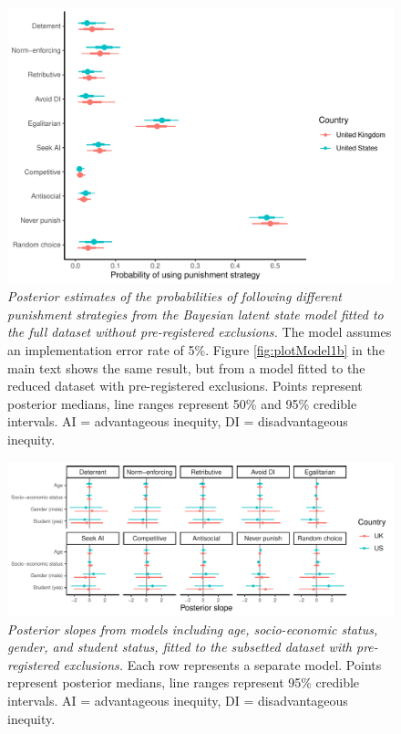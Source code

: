 \documentclass[
  man, donotrepeattitle,floatsintext]{apa6}
\begin{document}
\begin{figure}
\centering
\includegraphics{manuscript_files/figure-latex/plotModel1a-1.pdf}
\caption{\label{fig:plotModel1a}\emph{Posterior estimates of the probabilities of following
different punishment strategies from the Bayesian latent state model fitted to
the full dataset without pre-registered exclusions.} The model assumes an
implementation error rate of 5\%. Figure \ref{fig:plotModel1b} in the main text
shows the same result, but from a model fitted to the reduced dataset with
pre-registered exclusions. Points represent posterior medians, line ranges
represent 50\% and 95\% credible intervals. AI = advantageous inequity, DI =
disadvantageous inequity.}
\end{figure}

\newpage







\begin{figure}
\centering
\includegraphics{manuscript_files/figure-latex/plotAllDems2-1.pdf}
\caption{\label{fig:plotAllDems2}\emph{Posterior slopes from models including age,
socio-economic status, gender, and student status, fitted to the subsetted
dataset with pre-registered exclusions.} Each row represents a separate model.
Points represent posterior medians, line ranges represent 95\% credible
intervals. AI = advantageous inequity, DI = disadvantageous inequity.}
\end{figure}
\end{document}
